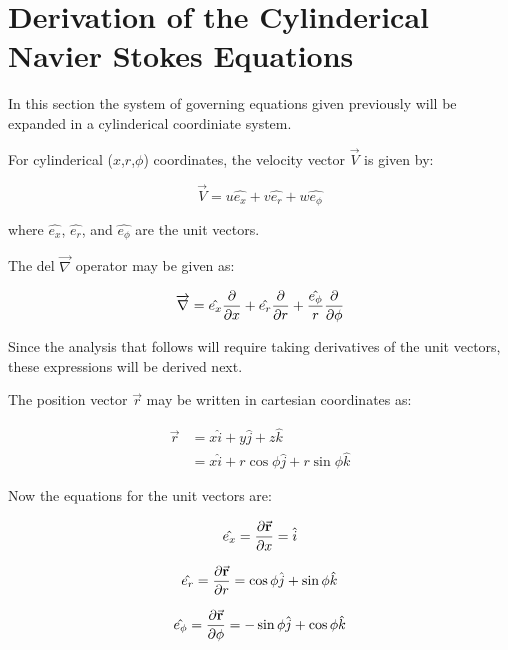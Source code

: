 \section{Derivation of the Cylinderical Navier Stokes Equations}

In this section the system of governing equations given previously will be
expanded in a cylinderical coordiniate system.

For cylinderical ($x$,$r$,$\phi$) coordinates, the velocity vector
$\overrightarrow{V}$ is given by:

\begin{equation}
\overrightarrow{V} = u \hat{e_x} + v \hat{e_r} + w \hat{e_\phi}
\end{equation}

where $\hat{e_x}$, $\hat{e_r}$, and $\hat{e_\phi}$ are the unit vectors.

The del $\overrightarrow{\nabla}$ operator may be given as:

\begin{equation}
  \overrightarrow{\nabla} =  
      \hat{e_x}\pdv{x} 
    + \hat{e_r}\pdv{r} 
    + \frac{\hat{e_\phi}}{r}\pdv{\phi}
\end{equation}

Since the analysis that follows will require taking derivatives of the unit
vectors, these expressions will be derived next.

The position vector $\overrightarrow{r}$ may be written in cartesian coordinates as:

\begin{equation}
  \begin{aligned}
    \overrightarrow{r} &= x\hat{i} + y\hat{j} + z\hat{k} \\
        &= x\hat{i} + r\cos\phi\hat{j} + r\sin\phi\hat{k}
  \end{aligned}
\end{equation}

Now the equations for the unit vectors are:

\begin{equation}
  \hat{e_x} = 
  \pdv{\va{r}}{x} = \hat{i}
\end{equation}

\begin{equation}
  \hat{e_r} 
  = \pdv{\va{r}}{r} 
  = \cos{\phi}\hat{j} + \sin{\phi}\hat{k}
\end{equation}

\begin{equation}
  \hat{e_\phi} 
  = \pdv{\va{r}}{\phi}
  = - \sin{\phi}\hat{j} + \cos{\phi}\hat{k}
\end{equation}

